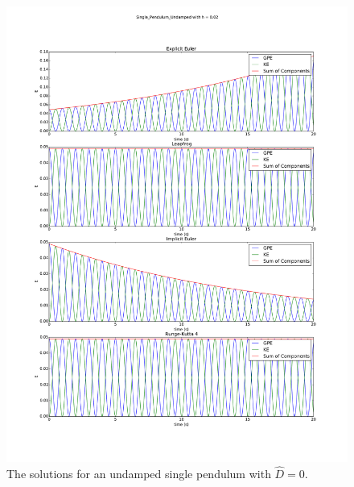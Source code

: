 \documentclass{article}
\begin{document}
\begin{figure}
\begin{center}
\includegraphics[height=0.9\textheight]{Single_Pendulum_Undamped_Energy_Components}
\caption{The solutions for an undamped single pendulum with $\hat{D}=0$. }
\label{fig:singleundampedenergy}
\end{center}
\end{figure}
\end{document}
